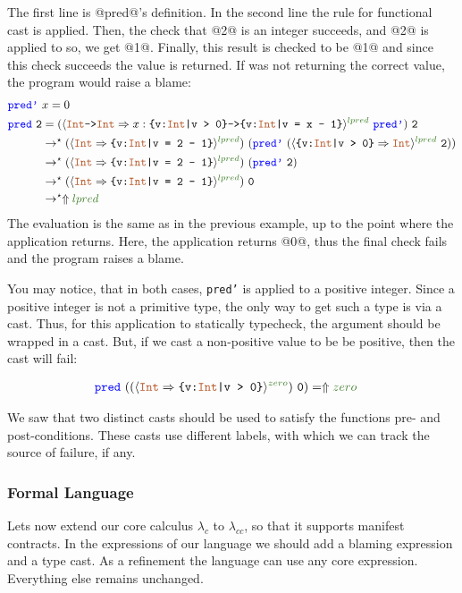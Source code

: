 The first line is @pred@'s definition. In the second line the rule for functional cast is applied.
Then, the check that @2@ is an integer succeeds, and @2@ is applied to \prednamep
so, we get @1@.
Finally, this result is checked to be @1@ and since this check succeeds the value is returned.
%
If \prednamep was not returning the correct value, the program would raise a blame:
\begin{align*}
\prednamep\ & x= 0 \\
\predname\ \texttt{2} &=
(\ecast{\tyint \texttt{->} \tyint}{x:\ttpos \texttt{->} \ttpred{x}}{lpred} \ \prednamep)\ \texttt{2} \\
&\rightarrow^\star (\ecast{\tyint}{\ttpred{2}}{lpred}) \ (\prednamep\ (\ecast{\ttpos}{\tyint}{lpred} \ \texttt{2})) \\ 
&\rightarrow^\star (\ecast{\tyint}{\ttpred{2}}{lpred}) \ (\prednamep\ \texttt{2}) \\ 
&\rightarrow^\star (\ecast{\tyint}{\ttpred{2}}{lpred}) \ \texttt{0} \\ 
&\rightarrow^\star \elabel{lpred} \\ 
\end{align*}
The evaluation is the same as in the previous example, 
up to the point where the \prednamep application returns.
Here, the application returns @0@, thus the final check fails 
and the program raises a blame.

You may notice, that in both cases, \texttt{pred'} is applied to a 
positive integer.
Since a positive integer is not a primitive type, 
the only way to get such a type is via a cast.
Thus, for this application to statically typecheck, the argument should 
be wrapped in a cast.
But, if we cast a non-positive value to be be positive,
then the cast will fail:

\begin{align*}
\predname \ ((\ecast{\tyint}{\ttpos}{zero})\ \texttt{0}) &= \elabel{zero}
\end{align*}

We saw that two distinct casts should be used to satisfy the functions pre- and post-conditions.
These casts use different labels, with which we can track the source of failure, if any.

\subsubsection{Formal Language}
Lets now extend our core calculus $\lambda_c$ to $\lambda_{cc}$,
so that it supports manifest contracts.
%
In the expressions of our language we should add a blaming expression
and a type cast.
As a refinement the language can use any core expression.
Everything else remains unchanged.


